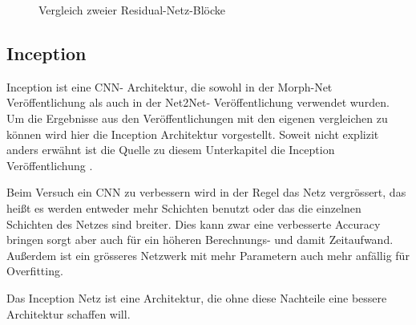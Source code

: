 \begin{figure}[h]
 \centering
 \qquad
       \caption{Vergleich zweier Residual-Netz-Blöcke \cite{resnet}}
\end{figure}

\subsection{Inception}\label{sec:inception}
\color{blue1}
Inception ist eine CNN- Architektur, die sowohl in der Morph-Net Veröffentlichung als auch in der Net2Net- Veröffentlichung verwendet wurden. Um die Ergebnisse aus den Veröffentlichungen mit den eigenen vergleichen zu können wird hier die Inception Architektur vorgestellt. Soweit nicht explizit anders erwähnt ist die Quelle zu diesem Unterkapitel die Inception Veröffentlichung \cite{Inception}.


Beim Versuch ein CNN zu verbessern wird in der Regel das Netz vergrössert, das heißt es werden entweder mehr Schichten benutzt oder das die einzelnen Schichten des Netzes sind breiter. Dies kann zwar eine verbesserte Accuracy bringen sorgt aber auch für ein höheren Berechnungs- und damit Zeitaufwand. Außerdem ist ein grösseres Netzwerk mit mehr Parametern auch mehr anfällig für Overfitting.

Das Inception Netz ist eine Architektur, die ohne diese Nachteile eine bessere Architektur schaffen will.





